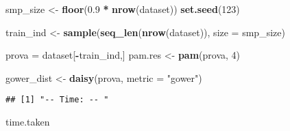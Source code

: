 \documentclass[
]{article}
\newenvironment{Shaded}{\begin{snugshade}}{\end{snugshade}}
\newcommand{\ControlFlowTok}[1]{\textcolor[rgb]{0.13,0.29,0.53}{\textbf{#1}}}
\newcommand{\DataTypeTok}[1]{\textcolor[rgb]{0.13,0.29,0.53}{#1}}
\newcommand{\DecValTok}[1]{\textcolor[rgb]{0.00,0.00,0.81}{#1}}
\newcommand{\FloatTok}[1]{\textcolor[rgb]{0.00,0.00,0.81}{#1}}
\newcommand{\KeywordTok}[1]{\textcolor[rgb]{0.13,0.29,0.53}{\textbf{#1}}}
\newcommand{\NormalTok}[1]{#1}
\newcommand{\OperatorTok}[1]{\textcolor[rgb]{0.81,0.36,0.00}{\textbf{#1}}}
\newcommand{\OtherTok}[1]{\textcolor[rgb]{0.56,0.35,0.01}{#1}}
\newcommand{\StringTok}[1]{\textcolor[rgb]{0.31,0.60,0.02}{#1}}
\begin{document}
\begin{Shaded}
\begin{Highlighting}[]
\NormalTok{smp_size <-}\StringTok{ }\KeywordTok{floor}\NormalTok{(}\FloatTok{0.9} \OperatorTok{*}\StringTok{ }\KeywordTok{nrow}\NormalTok{(dataset))}
\KeywordTok{set.seed}\NormalTok{(}\DecValTok{123}\NormalTok{)}

\NormalTok{train_ind <-}\StringTok{ }\KeywordTok{sample}\NormalTok{(}\KeywordTok{seq_len}\NormalTok{(}\KeywordTok{nrow}\NormalTok{(dataset)), }\DataTypeTok{size =}\NormalTok{ smp_size)}

\NormalTok{prova =}\StringTok{ }\NormalTok{dataset[}\OperatorTok{-}\NormalTok{train_ind,]}
\NormalTok{pam.res <-}\StringTok{ }\KeywordTok{pam}\NormalTok{(prova, }\DecValTok{4}\NormalTok{)}

\NormalTok{gower_dist <-}\StringTok{ }\KeywordTok{daisy}\NormalTok{(prova, }\DataTypeTok{metric =} \StringTok{"gower"}\NormalTok{)}
\end{Highlighting}
\end{Shaded}

\begin{Shaded}
\end{Shaded}

\begin{verbatim}
## [1] "-- Time: -- "
\end{verbatim}

\begin{Shaded}
\begin{Highlighting}[]
\NormalTok{time.taken}
\end{Highlighting}
\end{Shaded}
\end{document}
